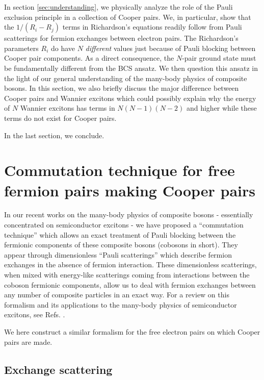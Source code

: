 \documentclass[epj]{svjour}
\begin{document}
In section \ref{sec:understanding},  we physically analyze the role of the Pauli exclusion principle in a collection of Cooper pairs. We, in particular, show that the $1/(R_i-R_j)$ terms in Richardson's equations readily follow
from Pauli scatterings for fermion exchanges 
between electron pairs. The Richardson's parameters $R_i$  do have $N$ \emph{different} values just because 
of Pauli blocking between Cooper pair components. As a direct consequence, the $N$-pair ground state must be fundamentally different from the BCS ansatz. We then question this ansatz in the light of our general understanding of the many-body physics of composite bosons. In this section, we also briefly discuss the major difference between Cooper pairs and Wannier excitons which could possibly explain why the energy of $N$ Wannier excitons has terms in $N(N-1)(N-2)$ and higher while these terms do not exist for Cooper pairs.

In the last section, we conclude.








\section{Commutation technique for free fermion pairs making Cooper pairs\label{sec:beta}}

In our recent works on the many-body physics of composite bosons - essentially concentrated on semiconductor excitons - we have
proposed a ``commutation technique'' which allows an exact treatment of Pauli blocking between the fermionic components of these composite
bosons (cobosons in short). They appear through dimensionless ``Pauli scatterings'' which describe fermion
exchanges in the absence of fermion interaction. These dimensionless
scatterings, when mixed with energy-like scatterings coming from interactions
between the coboson fermionic components, allow us to deal with fermion exchanges
between any number of composite particles in an exact way. For a review on
this formalism and its applications to the many-body physics of
semiconductor excitons, see Refs. \cite%
{CobosonPhysicsReports}.

We here construct a similar formalism for the free electron pairs on which Cooper pairs are made.


\subsection{Exchange scattering}
\end{document}
